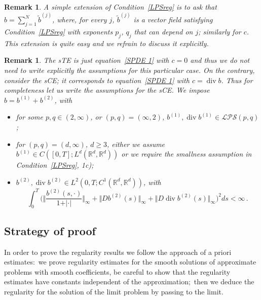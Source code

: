 \documentclass[a4paper,10pt]{article}
\newtheorem{remark}[theorem]{Remark}
\begin{document}
\begin{remark}
A simple extension of Condition~\ref{LPSreg} is to ask that $b=\sum_{j=1}^{N} 
\tilde{b}^{(j)}$, where, for every $j$, $\tilde{b}^{(j)}$ is a vector field
satisfying Condition~\ref{LPSreg} with exponents $p_{j}$, $q_{j}$ that can 
depend on $j$; similarly for $c$. This extension is quite easy and we refrain to discuss it explicitly.
\end{remark}

\begin{remark}
\label{Remark assumptions sCE}The sTE is just equation~\eqref{SPDE 1} with
$c=0$ and thus we do not need to write explicitly the assumptions for this
particular case. On the contrary, consider the sCE; it corresponds to equation~\eqref{SPDE 1} with $c=\operatorname{div}b$. Thus for completeness let us
write the assumptions for the sCE. We impose $b=b^{(1)}+b^{(2)}$, with
\begin{itemize}
  \item[$(i_{0})$] for some $p,q\in(2,\infty)$, or $(p,q)
=(\infty,2)$, $b^{(1)},\operatorname{div} 
b^{(1)} \in \mathcal{LPS}(p,q)$;
  \item[$(i_{1})$] for $(p,q)  =(d,\infty)$, $d\geq3$, either we assume $b^{(1)}\in C([0,T];L^{d}(\mathbb{R}^{d},\mathbb{R}^{d}))$ or we require the smallness assumption in Condition~\ref{LPSreg}, 1c);
  \item[$(ii)$] $b^{(2)},\operatorname{div}b^{(2)}\in L^{2}(0,T;C^{1}(\mathbb{R}^{d},\mathbb{R}^{d}))$, with
\[
\int_{0}^{T}\Big(\Big\Vert \frac{b^{(2)}(s,\cdot)}{1+\vert \cdot\vert} \Big\Vert_{\infty
}+\big\Vert Db^{(2)}(s)  \big\Vert_{\infty}+ \big\Vert D\operatorname{div}b^{(2)} (s)
\big\Vert_{\infty}\Big)^2  ds<\infty \,.
\]
\end{itemize}
\end{remark}


\subsection{Strategy of proof}
\label{subsection_strategy_regularity}

In order to prove the regularity results we follow the approach of a priori
estimates:\ we prove regularity estimates for the smooth solutions of
approximate problems with smooth coefficients, be careful to show that the
regularity estimates have constants independent of the approximation;\ then we
deduce the regularity for the solution of the limit problem by passing to the limit.
\end{document}
